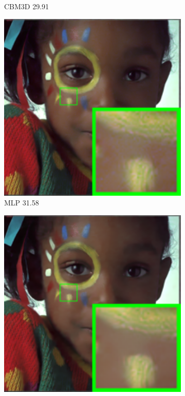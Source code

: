 \begin{figure}
\begin{subfigure}[t]{0.19\textwidth}
		\caption{CBM3D 29.91}
    \end{subfigure}
    \hfill
    \begin{subfigure}[t]{0.19\textwidth}
        \centering
        \includegraphics[width=1\textwidth]{images/mcwnnm/24images/resize_br_MLP_nSig53015_kodim15.png}
\caption{MLP 31.58}
    \end{subfigure}
    \hfill
    \begin{subfigure}[t]{0.19\textwidth}
        \centering
        \includegraphics[width=1\textwidth]{images/mcwnnm/24images/resize_br_TNRD_nSig53015_kodim15.png}

\end{subfigure}
\end{figure}

